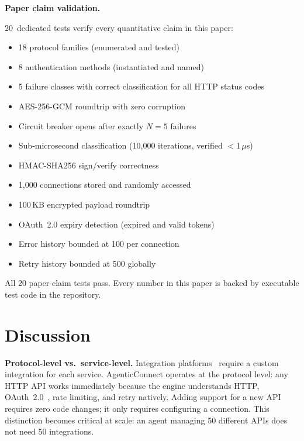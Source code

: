 \documentclass[10pt, twocolumn]{article}
\begin{document}
\textbf{Paper claim validation.}

20~dedicated tests verify every quantitative claim in this paper:

\begin{itemize}[nosep, leftmargin=*]
\item 18 protocol families (enumerated and tested)
\item 8 authentication methods (instantiated and named)
\item 5 failure classes with correct classification for all HTTP status codes
\item AES-256-GCM roundtrip with zero corruption
\item Circuit breaker opens after exactly $N{=}5$ failures
\item Sub-microsecond classification (10{,}000 iterations, verified $<$1\,$\mu$s)
\item HMAC-SHA256 sign/verify correctness
\item 1{,}000 connections stored and randomly accessed
\item 100\,KB encrypted payload roundtrip
\item OAuth~2.0 expiry detection (expired and valid tokens)
\item Error history bounded at 100 per connection
\item Retry history bounded at 500 globally
\end{itemize}

All 20 paper-claim tests pass. Every number in this paper is backed by executable test code in the repository.

\section{Discussion}
\label{sec:discussion}

\textbf{Protocol-level vs.\ service-level.} Integration platforms~\cite{zapier2024} require a custom integration for each service. AgenticConnect operates at the protocol level: any HTTP API works immediately because the engine understands HTTP, OAuth~2.0~\cite{rfc6749}, rate limiting, and retry natively. Adding support for a new API requires zero code changes; it only requires configuring a connection. This distinction becomes critical at scale: an agent managing 50 different APIs does not need 50 integrations.
\end{document}
